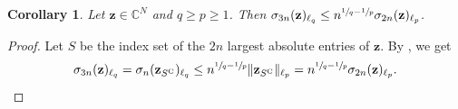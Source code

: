 \documentclass[11pt,reqno, a4paper]{article}
\numberwithin{equation}{section}
\newtheorem{corollary}[theorem]{Corollary}
\newcommand{\C}{\mathbb{C}}
\begin{document}
\begin{corollary}\label{thm:Sigmas}
Let $\mathbf{z}\in\C^N$ and $q\geq p\geq 1$. Then $\sigma_{3n}(\mathbf{z})_{\ell_q}\leq n^{\sfrac{1}{q}-\sfrac{1}{p}}\sigma_{2n}(\mathbf{z})_{\ell_p}$.
\end{corollary}

\begin{proof}
Let $S$ be the index set of the $2n$ largest absolute entries of $\mathbf{z}$. By , we get
\begin{equation}
    \sigma_{3n}(\mathbf{z})_{\ell_q}=\sigma_n(\mathbf{z}_{S^{\mathrm{C}}})_{\ell_q}\leq n^{\sfrac{1}{q}-\sfrac{1}{p}}\lVert \mathbf{z}_{S^{\mathrm{C}}}\rVert_{\ell_p}=n^{\sfrac{1}{q}-\sfrac{1}{p}}\sigma_{2n}(\mathbf{z})_{\ell_p}.\qedhere
\end{equation}
\end{proof}
\end{document}
